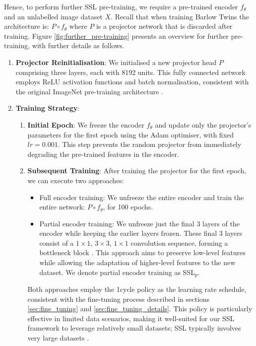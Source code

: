 \documentclass[a4paper,fleqn]{cas-dc}
\begin{document}
Hence, to perform further SSL pre-training, we require a pre-trained encoder $f_\theta$ and an unlabelled image dataset $X$. Recall that when training Barlow Twins the architecture is: $P \circ f_{\theta}$ where $P$ is a projector network that is discarded after training.   Figure \ref{fig:further_pre-training} presents an overview for further pre-training, with further details as follows. 

\begin{enumerate}
\item \textbf{Projector Reinitialisation}: We initialised a new projector head $P$ comprising three layers, each with 8192 units. This fully connected network employs ReLU activation functions and batch normalisation, consistent with the original ImageNet pre-training architecture \cite{zbontar2021barlow}.

\item \textbf{Training Strategy}:
\begin{enumerate}
\item \textbf{Initial Epoch}: We freeze  the encoder $f_{\theta}$ and update  only the projector's parameters for the first epoch using the Adam optimiser, with fixed $lr=0.001$. This step prevents the random projector from immediately degrading the pre-trained features in the encoder. %
\item \textbf{Subsequent Training}: After training the projector for the first epoch, we can execute two approaches:
\begin{itemize}
\item Full encoder training: We unfreeze the entire encoder and train the entire network: $P \circ f_{\theta}$, for 100 epochs.
\item Partial encoder training: We unfreeze just the final 3 layers of the encoder while keeping the earlier layers frozen. These final 3 layers consist of a $1\times1$, $3\times3$, $1\times1$ convolution sequence, forming a bottleneck block \cite{he2016deep, torchvision_resnet50}. This approach aims to preserve low-level features while allowing the adaptation of higher-level features to the new dataset. We denote partial encoder training as SSL$_{p}$.
\end{itemize}

Both approaches employ the 1cycle policy \cite{smith2017super,smith2018disciplined} as the learning rate schedule, consistent with the fine-tuning process described in sections \ref{sec:fine_tuning} and \ref{sec:fine_tuning_details}. This policy is particularly effective in limited data scenarios, making it well-suited for our SSL framework to leverage relatively small datasets; SSL typically involves very large datasets \cite{lecun2021self}.
\end{enumerate}
\end{enumerate}
\end{document}

